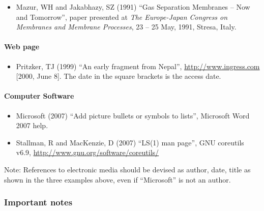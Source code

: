 \documentclass[a5paper, 10pt]{article}
\begin{document}
\begin{itemize}
\item Mazur, WH and Jakabhazy, SZ (1991) ``Gas Separation Membranes
  -- Now and Tomorrow'', paper presented at \textit{The Europe-Japan
    Congress on Membranes and Membrane Processes}, 23 -- 25 May, 1991,
  Stresa, Italy.
\end{itemize}

\paragraph{Web page}

\begin{itemize}
\item Pritzker, TJ (1999) ``An early fragment from Nepal'',
  \url{http://www.ingress.com} [2000, June 8].  The date in the square brackets is the access date.
\end{itemize}

\paragraph{Computer Software}
\label{page:ref_compsoftware}

\begin{itemize}
\item Microsoft (2007) ``Add picture bullets or symbols to lists'',
  Microsoft Word 2007 help.
\item Stallman, R and MacKenzie, D (2007) ``LS(1) man page'', GNU
  coreutils v6.9, \url{http://www.gnu.org/software/coreutils/}
\end{itemize}

Note: References to electronic media should be devised as author,
date, title as shown in the three examples above, even if
``Microsoft'' is not an author.

\subsubsection*{Important notes}
\end{document}
